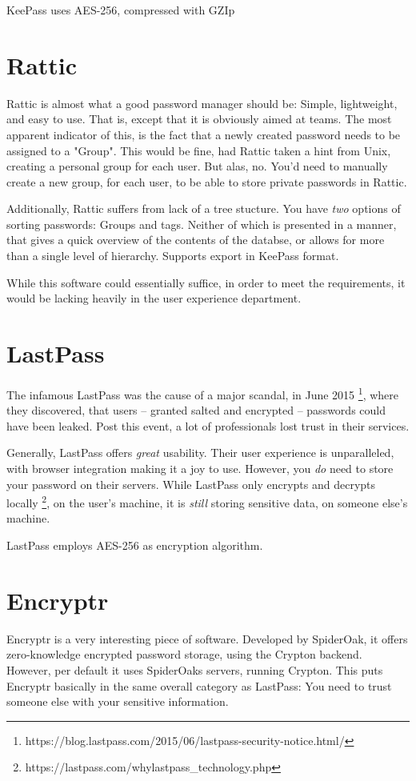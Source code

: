 \documentclass[a4paper,10pt]{article}
\begin{document}
	KeePass uses AES-256, compressed with GZIp


\section{Rattic}
	Rattic is almost what a good password manager should be: Simple, lightweight, and easy to use. That is, except that it is obviously aimed at teams. The most apparent indicator of this, is the fact that a newly created password needs to be assigned to a "Group". This would be fine, had Rattic taken a hint from Unix, creating a personal group for each user. But alas, no. You'd need to manually create a new group, for each user, to be able to store private passwords in Rattic.

	Additionally, Rattic suffers from lack of a tree stucture. You have \emph{two} options of sorting passwords: Groups and tags. Neither of which is presented in a manner, that gives a quick overview of the contents of the databse, or allows for more than a single level of hierarchy. Supports export in KeePass format.
	
	While this software could essentially suffice, in order to meet the requirements, it would be lacking heavily in the user experience department.


\section{LastPass}
	The infamous LastPass was the cause of a major scandal, in June 2015 \footnote{https://blog.lastpass.com/2015/06/lastpass-security-notice.html/}, where they discovered, that users -- granted salted and encrypted -- passwords could have been leaked. Post this event, a lot of professionals lost trust in their services.

	Generally, LastPass offers \emph{great} usability. Their user experience is unparalleled, with browser integration making it a joy to use. However, you \emph{do} need to store your password on their servers. While LastPass only encrypts and decrypts locally \footnote{https://lastpass.com/whylastpass\_technology.php}, on the user's machine, it is \emph{still} storing sensitive data, on someone else's machine.

	LastPass employs AES-256 as encryption algorithm.



\section{Encryptr}
	Encryptr is a very interesting piece of software. Developed by SpiderOak, it offers zero-knowledge encrypted password storage, using the Crypton backend. However, per default it uses SpiderOaks servers, running Crypton. This puts Encryptr basically in the same overall category as LastPass: You need to trust someone else with your sensitive information. 
\end{document}
